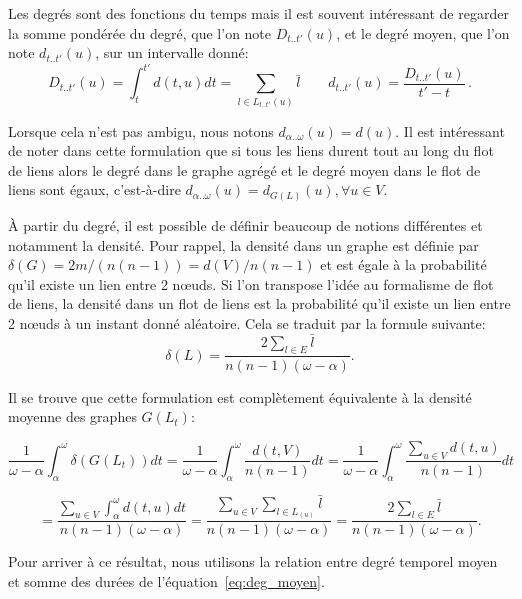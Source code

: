 Les degrés sont des fonctions du temps mais il est souvent intéressant de regarder la somme pondérée du degré, que l'on note $D_{t..t'}(u)$, et le degré moyen, que l'on note $d_{t..t'}(u)$, sur un intervalle donné:
\begin{equation}
D_{t..t'}(u)= \int_{t}^{t'}d(t,u) dt  = \sum_{l \in L_{t..t'}(u)}\bar{l} \qquad
d_{t..t'}(u)= \dfrac{D_{t..t'}(u)}{t'-t}\, .
\label{eq:deg_moyen}
\end{equation}

Lorsque cela n'est pas ambigu, nous notons $d_{\alpha..\omega}(u) = d(u)$.
Il est intéressant de noter dans cette formulation que si tous les liens durent tout au long du flot de liens alors le degré dans le graphe agrégé et le degré moyen dans le flot de liens sont égaux, c'est-à-dire  $d_{\alpha..\omega}(u) = d_{G(L)}(u), \forall u \in V$.

\`A partir du degré, il est possible de définir beaucoup de notions différentes et notamment la densité.
Pour rappel, la densité dans un graphe est définie par $\delta(G)=2m/(n(n-1))=d(V)/n(n-1)$ et est égale à la probabilité qu'il existe un lien entre 2 n\oe{}uds.
Si l'on transpose l'idée au formalisme de flot de liens, la densité dans un flot de liens est la probabilité qu'il existe un lien entre 2 n\oe{}uds à un instant donné aléatoire.
Cela se traduit par la formule suivante:
\begin{equation}
\delta(L)= \dfrac{2 \sum_{l \in E}\bar{l}}{n(n-1) (\omega-\alpha)}.
\end{equation}

Il se trouve que cette formulation est complètement équivalente à la densité moyenne des graphes $G(L_t)$:

\begin{equation*}
\dfrac{1}{\omega-\alpha} \int_{\alpha}^{\omega} \delta(G(L_t)) dt=
\dfrac{1}{\omega-\alpha} \int_{\alpha}^{\omega} \dfrac{d(t,V)}{n(n-1)}dt=
 \dfrac{1}{\omega-\alpha} \int_{\alpha}^{\omega} \dfrac{\sum_{u \in V} d(t,u)}{n(n-1)}dt
 \end{equation*}

 \begin{equation*}
= \dfrac{\sum_{u \in V} \int_{\alpha}^{\omega}d(t,u)dt}{n(n-1)(\omega-\alpha)} =
\dfrac{\sum_{u \in V} \sum_{l \in L_(u)} \bar{l}}{n(n-1)(\omega-\alpha)} =
\dfrac{2\sum_{l \in E}\bar{l}}{n(n-1) (\omega-\alpha)} .
\end{equation*}

Pour arriver à ce résultat, nous utilisons la relation entre degré temporel moyen et somme des durées de l'équation~\ref{eq:deg_moyen}.

